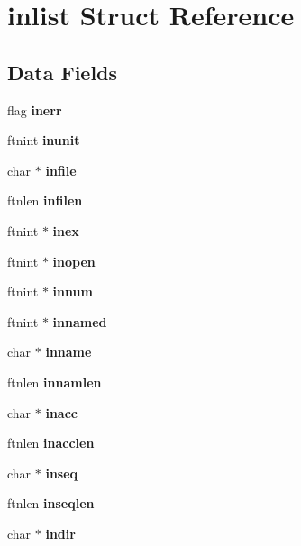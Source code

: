 \section{inlist Struct Reference}
\label{structinlist}
\subsection*{Data Fields}
\begin{DoxyCompactItemize}
\item 
\mbox{\label{structinlist_a58bf72b64fab5d27aa0f7ef878d5c8d2}} 
flag {\bfseries inerr}
\item 
\mbox{\label{structinlist_a69244da0365f1012d4ed89d569c7e687}} 
ftnint {\bfseries inunit}
\item 
\mbox{\label{structinlist_a335023ababe7eb52a89577de0a1f155c}} 
char $\ast$ {\bfseries infile}
\item 
\mbox{\label{structinlist_a09d868ed15261e31dfe2d6471d3f73e1}} 
ftnlen {\bfseries infilen}
\item 
\mbox{\label{structinlist_a6266bd70b0f26d29d084e9e159cf7907}} 
ftnint $\ast$ {\bfseries inex}
\item 
\mbox{\label{structinlist_a791dfdf3cc38883912c17f44dfbbb2af}} 
ftnint $\ast$ {\bfseries inopen}
\item 
\mbox{\label{structinlist_a0827d903d61f0f02e48414de0893e7a9}} 
ftnint $\ast$ {\bfseries innum}
\item 
\mbox{\label{structinlist_a020090cdbc0134b62d96dee447ded084}} 
ftnint $\ast$ {\bfseries innamed}
\item 
\mbox{\label{structinlist_ac34ac359c5711418bc7a0fe50bc017e5}} 
char $\ast$ {\bfseries inname}
\item 
\mbox{\label{structinlist_ae975e40f5e868451a31221c7cfe4da4e}} 
ftnlen {\bfseries innamlen}
\item 
\mbox{\label{structinlist_aa4fb66e031aa3c7c4d8659145091ff6b}} 
char $\ast$ {\bfseries inacc}
\item 
\mbox{\label{structinlist_a78dde025010d1d60468984985467e5a5}} 
ftnlen {\bfseries inacclen}
\item 
\mbox{\label{structinlist_a31bfcb7364ef9a1fd38262997247ca67}} 
char $\ast$ {\bfseries inseq}
\item 
\mbox{\label{structinlist_a552769caaf819b20716b02e9c713880d}} 
ftnlen {\bfseries inseqlen}
\item 
\mbox{\label{structinlist_aaff7195ea86562d29a61cb609145f01d}} 
char $\ast$ {\bfseries indir}
\item 

\end{DoxyCompactItemize}
